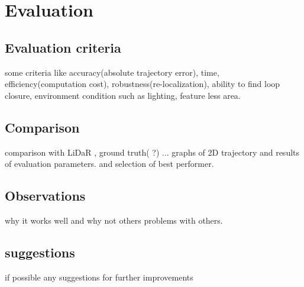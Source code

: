 
\section{Evaluation}

\subsection{Evaluation criteria}
some criteria  like accuracy(absolute trajectory error), time, efficiency(computation cost), robustness(re-localization), ability to find loop closure, environment condition such as lighting, feature less area.  


\subsection{Comparison}
comparison with LiDaR , ground truth( ?) ...
graphs  of 2D trajectory and results of evaluation parameters.
and selection of best performer. 

\subsection{Observations}
why it works well and why not others
problems with others. 

\subsection{suggestions}
if possible any suggestions for further improvements
